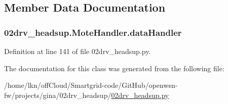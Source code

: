 \subsection{Member Data Documentation}
\subsubsection[{\texorpdfstring{data\+Handler}{dataHandler}}]{\setlength{\rightskip}{0pt plus 5cm}02drv\+\_\+headsup.\+Mote\+Handler.\+data\+Handler}\hypertarget{class02drv__headsup_1_1_mote_handler_a6f1c0e47361c7578a6acd364f0d192f5}{}\label{class02drv__headsup_1_1_mote_handler_a6f1c0e47361c7578a6acd364f0d192f5}


Definition at line 141 of file 02drv\+\_\+headsup.\+py.



The documentation for this class was generated from the following file\+:\begin{DoxyCompactItemize}
\item 
/home/lkn/off\+Cloud/\+Smartgrid-\/code/\+Git\+Hub/openwsn-\/fw/projects/gina/02drv\+\_\+headsup/\hyperlink{02drv__headsup_8py}{02drv\+\_\+headsup.\+py}\end{DoxyCompactItemize}
